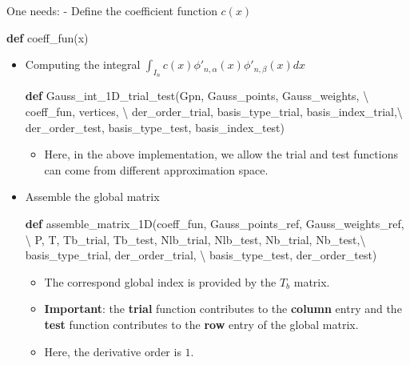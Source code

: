 \documentclass[11pt]{article}
\providecommand{\tightlist}{%
      \setlength{\itemsep}{0pt}\setlength{\parskip}{0pt}}
\newenvironment{Shaded}{}{}
\newcommand{\KeywordTok}[1]{\textcolor[rgb]{0.00,0.44,0.13}{\textbf{{#1}}}}
\newcommand{\NormalTok}[1]{{#1}}
\newcommand{\OperatorTok}[1]{\textcolor[rgb]{0.40,0.40,0.40}{{#1}}}
\begin{document}
One needs: - Define the coefficient function \(c(x)\)

\begin{Shaded}
\begin{Highlighting}[]
\KeywordTok{def}\NormalTok{ coeff_fun(x)}
\end{Highlighting}
\end{Shaded}

\begin{itemize}
\item
  Computing the integral
  \(\int_{I_n} c(x){\phi'_{n,\alpha}}(x){\phi'_{n,\beta}}(x)dx\)

\begin{Shaded}
\begin{Highlighting}[]
\KeywordTok{def}\NormalTok{ Gauss_int_1D_trial_test(Gpn, Gauss_points, Gauss_weights, }\OperatorTok{\textbackslash{}}
\NormalTok{            coeff_fun, vertices, }\OperatorTok{\textbackslash{}}
\NormalTok{            der_order_trial, basis_type_trial, basis_index_trial,}\OperatorTok{\textbackslash{}}
\NormalTok{            der_order_test,  basis_type_test,  basis_index_test)}
\end{Highlighting}
\end{Shaded}

  \begin{itemize}
  \tightlist
  \item
    Here, in the above implementation, we allow the trial and test
    functions can come from different approximation space.
  \end{itemize}
\item
  Assemble the global matrix

\begin{Shaded}
\begin{Highlighting}[]
\KeywordTok{def}\NormalTok{ assemble_matrix_1D(coeff_fun, Gauss_points_ref, Gauss_weights_ref, }\OperatorTok{\textbackslash{}}
\NormalTok{       P, T, Tb_trial, Tb_test, Nlb_trial, Nlb_test, Nb_trial, Nb_test,}\OperatorTok{\textbackslash{}}
\NormalTok{       basis_type_trial, der_order_trial, }\OperatorTok{\textbackslash{}}
\NormalTok{       basis_type_test, der_order_test)}
\end{Highlighting}
\end{Shaded}

  \begin{itemize}
  \tightlist
  \item
    The correspond global index is provided by the \(T_b\) matrix.
  \item
    \textbf{Important}: the \textbf{trial} function contributes to the
    \textbf{column} entry and the \textbf{test} function contributes to
    the \textbf{row} entry of the global matrix.
  \item
    Here, the derivative order is \(1\).
  \end{itemize}
\end{itemize}
\end{document}
